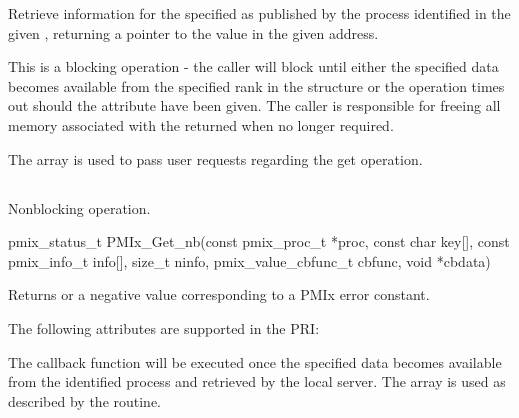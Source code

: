 \descr

Retrieve information for the specified  as published by the process identified in the given , returning a pointer to the value in the given address.

This is a blocking operation - the caller will block until either the specified data becomes available from the specified rank in the  structure or the operation times out should the  attribute have been given.
The caller is responsible for freeing all memory associated with the returned  when no longer required.

The  array is used to pass user requests regarding the get operation.


\subsection{}

\summary

Nonblocking  operation.

\format

\cspecificstart
\begin{codepar}
pmix_status_t
PMIx_Get_nb(const pmix_proc_t *proc, const char key[],
            const pmix_info_t info[], size_t ninfo,
            pmix_value_cbfunc_t cbfunc, void *cbdata)
\end{codepar}
\cspecificend

\begin{arglist}
\end{arglist}

Returns  or a negative value corresponding to a PMIx error constant.

\priattr
The following attributes are supported in the \ac{PRI}:


\descr

The callback function will be executed once the specified data becomes available from the identified process and retrieved by the local server.
The  array is used as described by the  routine.


